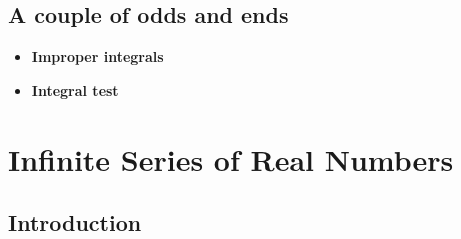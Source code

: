 \documentclass[11pt,a4paper]{article}
\begin{document}
\subsection{A couple of odds and ends}

\begin{itemize}
    \item \textbf{Improper integrals}
    \item \textbf{Integral test}
\end{itemize}

\break{}

\section{Infinite Series of Real Numbers}

\subsection{Introduction}
\end{document}
